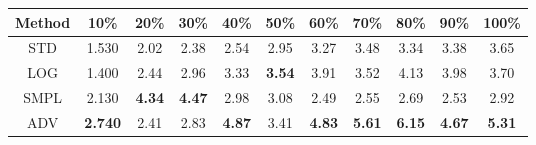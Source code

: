 \documentclass{standalone}
\begin{document}
\begin{tabular}{c|cccccccccc}
      \toprule
      Method & 10\% & 20\% & 30\% & 40\% & 50\% & 60\% & 70\% & 80\% & 90\% & 100\% \\
      \midrule
STD & 1.530 & 2.02 & 2.38 & 2.54 & 2.95 & 3.27 & 3.48 & 3.34 & 3.38 & 3.65\\
LOG & 1.400 & 2.44 & 2.96 & 3.33 & \textbf{3.54} & 3.91 & 3.52 & 4.13 & 3.98 & 3.70\\
SMPL & 2.130 & \textbf{4.34} & \textbf{4.47} & 2.98 & 3.08 & 2.49 & 2.55 & 2.69 & 2.53 & 2.92\\
ADV & \textbf{2.740} & 2.41 & 2.83 & \textbf{4.87} & 3.41 & \textbf{4.83} & \textbf{5.61} & \textbf{6.15} & \textbf{4.67} & \textbf{5.31}\\
  \bottomrule
\end{tabular}
\end{document}
